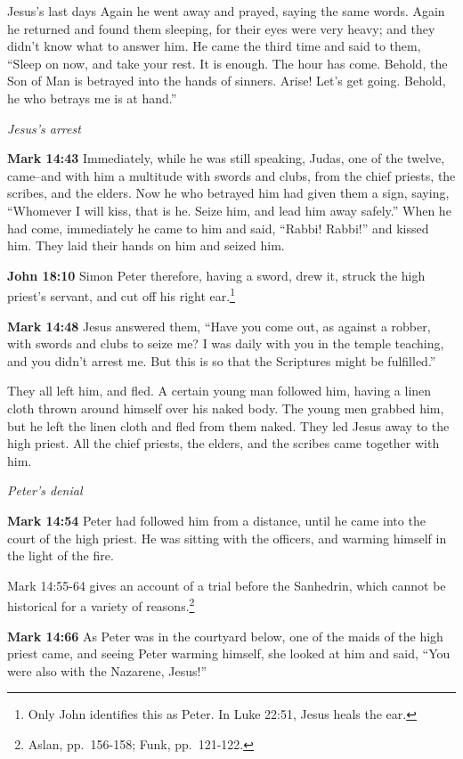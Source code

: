 \documentclass[10pt,twoside]{article} %
\newcommand{\quotesize}{\normalsize{}}
\newcommand{\comm}[1]{\begingroup \color{black!50} #1\endgroup}
\newenvironment{quotetext}{\begingroup\quotesize}{\endgroup}
\newcommand{\bible}[2]{\begin{quotetext}\textbf{#1} #2\end{quotetext}}
\newcommand{\gospelmark}[2]{\bible{Mark #1}{#2}}
\newcommand{\john}[2]{\bible{John #1}{#2}}
\newcommand{\subhead}[1]{\emph{#1}\par}
\begin{document}
\begin{section}{Jesus's last days}
{  Again he went away and prayed, saying the same words.   Again he returned and found them sleeping, for their eyes were very heavy; and they didn't know what to answer him.   He came the third time and said to them, ``Sleep on now, and take your rest. It is enough. The hour has come. Behold, the Son of Man is betrayed into the hands of sinners.    Arise! Let's get going. Behold, he who betrays me is at hand.''
}

\subhead{Jesus's arrest}

\gospelmark{14:43}{
  Immediately, while he was still speaking, Judas, one of the twelve, came--and with him a multitude with swords and clubs, from the chief priests, the scribes, and the elders.   Now he who betrayed him had given them a sign, saying, ``Whomever I will kiss, that is he. Seize him, and lead him away safely.''   When he had come, immediately he came to him and said, ``Rabbi! Rabbi!'' and kissed him.   They laid their hands on him and seized him.}

\john{18:10}{
  Simon Peter therefore, having a sword, drew it, struck the high priest’s servant, and cut off his right ear.\footnote{Only John identifies this as Peter. In Luke 22:51, Jesus heals the ear.}
}

\gospelmark{14:48}{
  Jesus answered them, ``Have you come out, as against a robber, with swords and clubs to seize me?    I was daily with you in the temple teaching, and you didn't arrest me. But this is so that the Scriptures might be fulfilled.''

  They all left him, and fled.   A certain young man followed him, having a linen cloth thrown around himself over his naked body. The young men grabbed him,   but he left the linen cloth and fled from them naked.   They led Jesus away to the high priest. All the chief priests, the elders, and the scribes came together with him.
}

\subhead{Peter's denial}

\gospelmark{14:54}{
  Peter had followed him from a distance, until he came into the court of the high priest. He was sitting with the officers, and warming himself in the light of the fire.}

\comm{Mark 14:55-64 gives an account of a trial before the Sanhedrin, which cannot be historical for a variety of reasons.\footnote{Aslan, pp.~156-158;
Funk, pp.~121-122.}}

\gospelmark{14:66}{
  As Peter was in the courtyard below, one of the maids of the high priest came,   and seeing Peter warming himself, she looked at him and said, ``You were also with the Nazarene, Jesus!''

}
\end{section}
\end{document}
